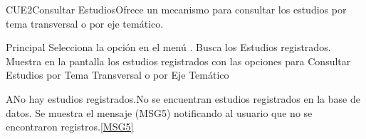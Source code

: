 

\begin{UseCase}{CUE2}{Consultar Estudios}{Ofrece un mecanismo para consultar los estudios por tema transversal o por eje temático.}
	\end{UseCase}
	
	
	
	
	
	\begin{UCtrayectoria}{Principal}
		\UCpaso[\UCactor] Selecciona la opción  en el menú .
		\UCpaso Busca los Estudios registrados.\label{Paso:CUE2BuscaEstudios}
		\UCpaso Muestra en la pantalla  los estudios registrados con las opciones para Consultar Estudios por Tema Transversal o por Eje Temático 
	\end{UCtrayectoria}

	\begin{UCtrayectoriaA}{A}{No hay estudios registrados.}{No se encuentran estudios registrados en la base de datos.}
			\UCpaso Se muestra el mensaje (MSG5) notificando al usuario que no se encontraron registros.\ref{MSG5}
	\end{UCtrayectoriaA}


	
